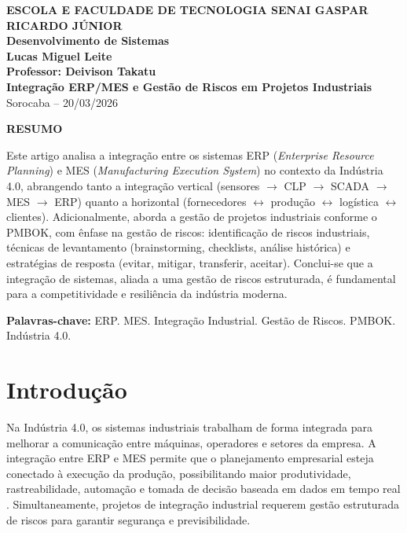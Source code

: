 \documentclass[12pt,a4paper,oneside]{article}
\begin{document}
\begin{center}
  \textbf{\large ESCOLA E FACULDADE DE TECNOLOGIA SENAI GASPAR RICARDO JÚNIOR}\\
  \textbf{Desenvolvimento de Sistemas}\\[1cm]
  \textbf{\Large Lucas Miguel Leite}\\[0.5cm]
  \textbf{Professor: Deivison Takatu}\\[2cm]
  \textbf{\LARGE\textbf{Integração ERP/MES e Gestão de Riscos em Projetos Industriais}}\\[1cm]
  Sorocaba -- 20/03/2026
\end{center}

\vspace{1cm}

\begin{center}
  \textbf{RESUMO}
\end{center}

Este artigo analisa a integração entre os sistemas ERP (\textit{Enterprise Resource Planning}) e MES (\textit{Manufacturing Execution System}) no contexto da Indústria 4.0, abrangendo tanto a integração vertical (sensores $\rightarrow$ CLP $\rightarrow$ SCADA $\rightarrow$ MES $\rightarrow$ ERP) quanto a horizontal (fornecedores $\leftrightarrow$ produção $\leftrightarrow$ logística $\leftrightarrow$ clientes). Adicionalmente, aborda a gestão de projetos industriais conforme o PMBOK, com ênfase na gestão de riscos: identificação de riscos industriais, técnicas de levantamento (brainstorming, checklists, análise histórica) e estratégias de resposta (evitar, mitigar, transferir, aceitar). Conclui-se que a integração de sistemas, aliada a uma gestão de riscos estruturada, é fundamental para a competitividade e resiliência da indústria moderna.

\vspace{0.5cm}
\textbf{Palavras-chave:} ERP. MES. Integração Industrial. Gestão de Riscos. PMBOK. Indústria 4.0.

\newpage

\section{Introdução}

Na Indústria 4.0, os sistemas industriais trabalham de forma integrada para melhorar a comunicação entre máquinas, operadores e setores da empresa. A integração entre ERP e MES permite que o planejamento empresarial esteja conectado à execução da produção, possibilitando maior produtividade, rastreabilidade, automação e tomada de decisão baseada em dados em tempo real \cite{groover2011}. Simultaneamente, projetos de integração industrial requerem gestão estruturada de riscos para garantir segurança e previsibilidade.
\end{document}

